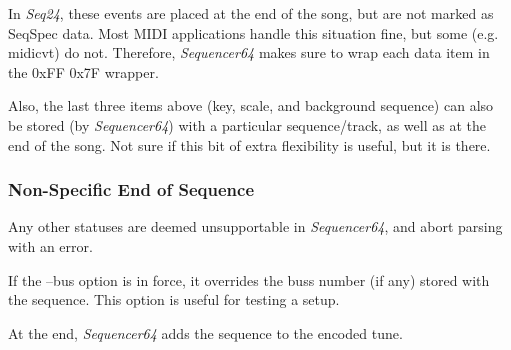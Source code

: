    In \textsl{Seq24}, these events are placed at the end of the song, but are
   not marked as SeqSpec data.  Most MIDI applications handle this situation
   fine, but some (e.g. midicvt) do not.  Therefore, \textsl{Sequencer64} makes
   sure to wrap each data item in the 0xFF 0x7F wrapper.

   Also, the last three items above (key, scale, and background sequence) can
   also be stored (by \textsl{Sequencer64}) with a particular sequence/track,
   as well as at the end of the song.  Not sure if this bit of extra
   flexibility is useful, but it is there.

\subsubsection{Non-Specific End of Sequence}
\label{subsubsec:midi_format_meta_sequence_ends}

   Any other statuses are deemed unsupportable in \textsl{Sequencer64}, and
   abort parsing with an error.

   If the --bus option is in force, it overrides the buss number (if any)
   stored with the sequence.  This option is useful for testing a setup.

   At the end, \textsl{Sequencer64} adds the sequence to the encoded tune.

